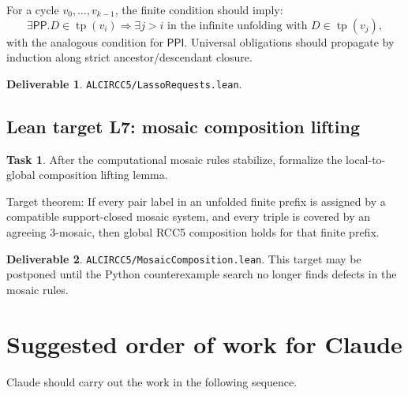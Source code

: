\documentclass[11pt]{article}
\newcommand{\PP}{\mathsf{PP}}
\newcommand{\PPI}{\mathsf{PPI}}
\newcommand{\tp}{\operatorname{tp}}
\theoremstyle{definition}
\newtheorem{task}{Task}
\newtheorem{deliverable}{Deliverable}
\theoremstyle{plain}
\begin{document}
For a cycle \(v_0,\ldots,v_{k-1}\), the finite condition should imply:
\[
\exists\PP.D\in\tp(v_i)
\Rightarrow
\exists j>i\text{ in the infinite unfolding with }D\in\tp(v_j),
\]
with the analogous condition for \(\PPI\).  Universal obligations should propagate by induction along strict ancestor/descendant closure.

\begin{deliverable}
\texttt{ALCIRCC5/LassoRequests.lean}.
\end{deliverable}

\subsection{Lean target L7: mosaic composition lifting}

\begin{task}
After the computational mosaic rules stabilize, formalize the local-to-global composition lifting lemma.
\end{task}

Target theorem:
If every pair label in an unfolded finite prefix is assigned by a compatible support-closed mosaic system, and every triple is covered by an agreeing 3-mosaic, then global RCC5 composition holds for that finite prefix.

\begin{deliverable}
\texttt{ALCIRCC5/MosaicComposition.lean}.  This target may be postponed until the Python counterexample search no longer finds defects in the mosaic rules.
\end{deliverable}

\section{Suggested order of work for Claude}

Claude should carry out the work in the following sequence.
\end{document}
